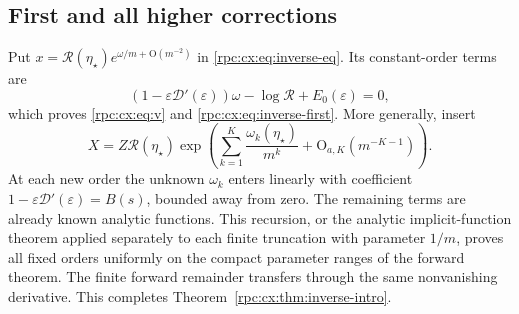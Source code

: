 \documentclass[11pt]{article}
\theoremstyle{definition}
\theoremstyle{remark}
\numberwithin{equation}{section}
\begin{document}
\subsection{First and all higher corrections}
Put $x=\mathcal R(\eta_\star)e^{\omega/m+\mathrm O(m^{-2})}$ in
\eqref{rpc:cx:eq:inverse-eq}. Its constant-order terms are
\begin{equation}
 (1-\varepsilon \mathcal D'(\varepsilon))\omega-\log\mathcal R+E_0(\varepsilon)=0,
\end{equation}
which proves \eqref{rpc:cx:eq:v} and \eqref{rpc:cx:eq:inverse-first}.
More generally, insert
\begin{equation}\label{rpc:cx:eq:inverse-all}
 X=Z\mathcal R(\eta_\star)\exp\left(\sum_{k=1}^K\frac{\omega_k(\eta_\star)}{m^k}
                            +\mathrm O_{a,K}(m^{-K-1})\right).
\end{equation}
At each new order the unknown $\omega_k$ enters linearly with coefficient
$1-\varepsilon \mathcal D'(\varepsilon)=B(s)$, bounded away from zero. The remaining terms
are already known analytic functions. This recursion, or the analytic
implicit-function theorem applied separately to each finite truncation
with parameter $1/m$, proves all fixed orders uniformly on the compact parameter ranges of the forward theorem.
The finite forward remainder transfers through the same nonvanishing
derivative. This completes Theorem~\ref{rpc:cx:thm:inverse-intro}.
\end{document}
